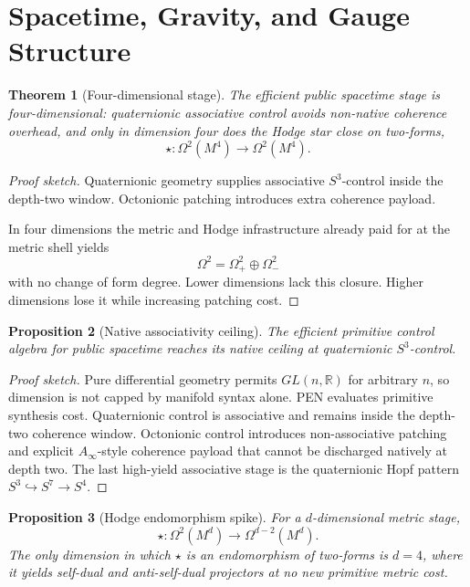 \documentclass[11pt]{article}
\theoremstyle{plain}
\newtheorem{theorem}{Theorem}[section]
\newtheorem{proposition}[theorem]{Proposition}
\theoremstyle{definition}
\theoremstyle{remark}
\newenvironment{proofsketch}{\begin{proof}[Proof sketch]}{\end{proof}}
\newcommand{\R}{\mathbb{R}}
\begin{document}
\section{Spacetime, Gravity, and Gauge Structure}

\begin{theorem}[Four-dimensional stage]
The efficient public spacetime stage is four-dimensional: quaternionic associative control avoids non-native coherence overhead, and only in dimension four does the Hodge star close on two-forms,
\[
\star:\Omega^2(M^4)\to\Omega^2(M^4).
\]
\end{theorem}

\begin{proofsketch}
Quaternionic geometry supplies associative \(S^3\)-control inside the depth-two window. Octonionic patching introduces extra coherence payload.

In four dimensions the metric and Hodge infrastructure already paid for at the metric shell yields
\[
\Omega^2=\Omega^2_+\oplus\Omega^2_-
\]
with no change of form degree. Lower dimensions lack this closure. Higher dimensions lose it while increasing patching cost.
\end{proofsketch}

\begin{proposition}[Native associativity ceiling]
The efficient primitive control algebra for public spacetime reaches its native ceiling at quaternionic \(S^3\)-control.
\end{proposition}

\begin{proofsketch}
Pure differential geometry permits \(GL(n,\R)\) for arbitrary \(n\), so dimension is not capped by manifold syntax alone. PEN evaluates primitive synthesis cost. Quaternionic control is associative and remains inside the depth-two coherence window. Octonionic control introduces non-associative patching and explicit \(A_\infty\)-style coherence payload that cannot be discharged natively at depth two. The last high-yield associative stage is the quaternionic Hopf pattern \(S^3\hookrightarrow S^7\to S^4\).
\end{proofsketch}

\begin{proposition}[Hodge endomorphism spike]
For a \(d\)-dimensional metric stage,
\[
\star:\Omega^2(M^d)\to\Omega^{d-2}(M^d).
\]
The only dimension in which \(\star\) is an endomorphism of two-forms is \(d=4\), where it yields self-dual and anti-self-dual projectors at no new primitive metric cost.
\end{proposition}
\end{document}

